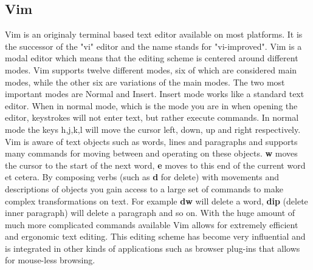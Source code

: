 \documentclass[a4paper,english]{ifimaster}
\begin{document}
\subsection{Vim}
Vim is an originaly terminal based text editor available on most platforms.
It is the successor of the "vi" editor and the name stands for "vi-improved".
Vim is a modal editor which means that the editing scheme is centered around different modes.
Vim supports twelve different modes, six of which are considered main modes, while the other six
are variations of the main modes.
The two most important modes are Normal and Insert.
Insert mode works like a standard text editor.
When in normal mode, which is the mode you are in when opening the editor, keystrokes will not enter text, but rather execute commands.
In normal mode the keys h,j,k,l will move the cursor left, down, up and right respectively.
Vim is aware of text objects such as words, lines and paragraphs and supports many commands for moving between and operating on these objects.
\textbf{w} moves the cursor to the start of the next word, \textbf{e} moves to this end of the current word et cetera.
By composing verbs (such as \textbf{d} for delete) with movements and descriptions of objects you gain access to a large
set of commands to make complex transformations on text.
For example \textbf{dw} will delete a word, \textbf{dip} (delete inner paragraph) will delete a paragraph and so on.
With the huge amount of much more complicated commands available Vim allows for extremely efficient and ergonomic text editing.
This editing scheme has become very influential and is integrated in other kinds of applications such as browser plug-ins
that allows for mouse-less browsing.
\end{document}
